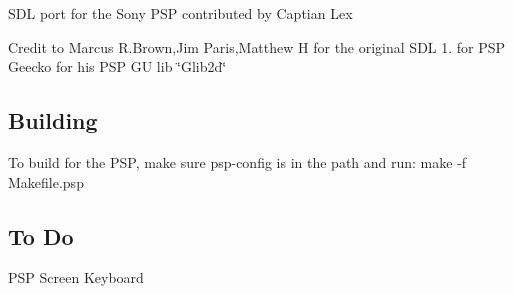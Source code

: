 S\+DL port for the Sony P\+SP contributed by Captian Lex

Credit to Marcus R.\+Brown,Jim Paris,Matthew H for the original S\+DL 1. for P\+SP Geecko for his P\+SP GU lib \char`\"{}\+Glib2d\char`\"{}

\subsection*{Building }

To build for the P\+SP, make sure psp-\/config is in the path and run\+: make -\/f Makefile.\+psp

\subsection*{To Do }

P\+SP Screen Keyboard 